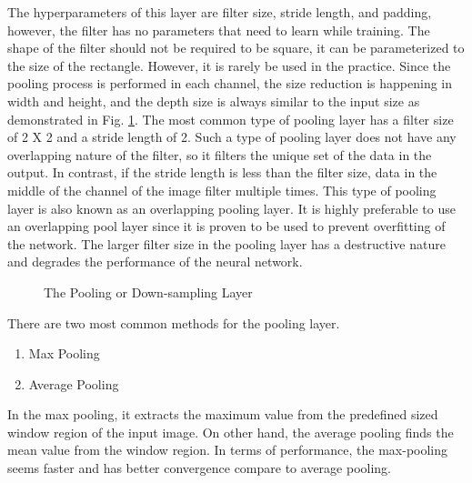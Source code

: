 The hyperparameters of this layer are filter size, stride length, and padding, however, the filter has no parameters that need to learn while training. The shape of the filter should not be required to be square, it can be parameterized to the size of the rectangle. However, it is rarely be used in the practice. Since the pooling process is performed in each channel, the size reduction is happening in width and height, and the depth size is always similar to the input size as demonstrated in Fig. \ref{downsample}. The most common type of pooling layer has a filter size of 2 X 2 and a stride length of 2. Such a type of pooling layer does not have any overlapping nature of the filter, so it filters the unique set of the data in the output. In contrast, if the stride length is less than the filter size, data in the middle of the channel of the image filter multiple times. This type of pooling layer is also known as an overlapping pooling layer. It is highly preferable to use an overlapping pool layer since it is proven to be used to prevent overfitting of the network. The larger filter size in the pooling layer has a destructive nature and degrades the performance of the neural network. 

\begin{figure}
    \centering
    \caption{The Pooling or Down-sampling Layer \cite{computersciencewiki}}
    \label{downsample}
\end{figure} 

There are two most common methods for the pooling layer. 

\begin{enumerate}
    \item Max Pooling
    \item Average Pooling
\end{enumerate}

In the max pooling, it extracts the maximum value from the predefined sized window region of the input image. On other hand, the average pooling finds the mean value from the window region. In terms of performance, the max-pooling seems faster and has better convergence compare to average pooling. 

